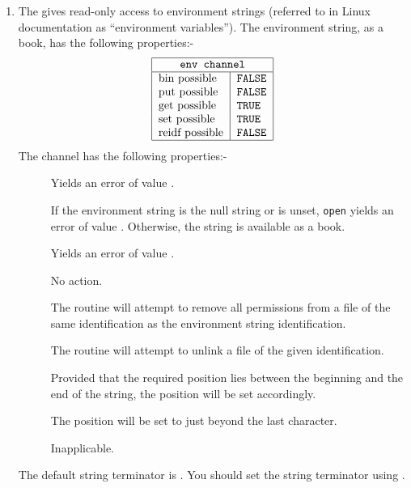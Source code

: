 \begin{enumerate}
\item {}\newline
The  gives read-only access to environment strings (referred to
in Linux documentation as ``environment variables''). The environment
string, as a book, has the following properties:-
$$\begin{tabular}{|l|l|}\hline
  \multicolumn{2}{|c|}{\texttt{env channel}}\\ \hline
  bin possible & \texttt{FALSE} \\
  put possible & \texttt{FALSE} \\
  get possible & \texttt{TRUE} \\
  set possible & \texttt{TRUE} \\
  reidf possible & \texttt{FALSE}\\ \hline
  \end{tabular}
$$
The channel has the following properties:-
\begin{description}
\item[] Yields an error of value\newline
{}.
\item[] If the environment string is the null string or
is unset, \verb|open| yields an error of value\newline
{}.  Otherwise, the string is available
as a book.
\item[] Yields an error of value\newline
{}.
\item[] No action.
\item[] The routine will attempt to remove all
permissions from a file of the same identification as the environment
string identification.
\item[] The routine will attempt to unlink a file of
the given identification.
\item[] Provided that the required position lies between the
beginning and the end of the string, the position will be set
accordingly.
\item[] The position will be set to just beyond
the last character.
\item[] Inapplicable.
\end{description}
The default string terminator is . You should set the string
terminator using .


\end{enumerate}
